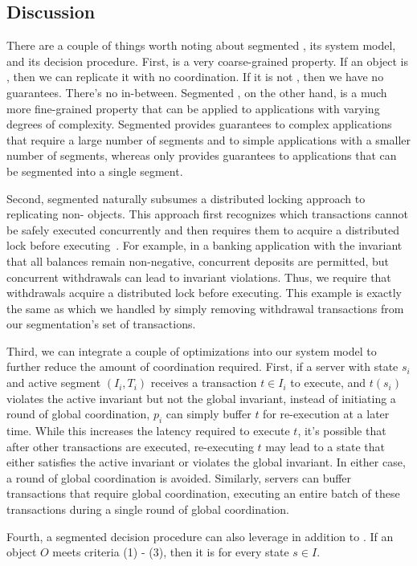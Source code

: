 \subsection{Discussion}
There are a couple of things worth noting about segmented
\invariantconfluence{}, its system model, and its decision procedure. First,
\invariantconfluence{} is a very coarse-grained property. If an object is
\invariantconfluent{}, then we can replicate it with no coordination. If it is
not \invariantconfluent{}, then we have no guarantees. There's no in-between.
Segmented \invariantconfluence{}, on the other hand, is a much more
fine-grained property that can be applied to applications with varying degrees
of complexity. Segmented \invariantconfluence{} provides guarantees to complex
applications that require a large number of segments and to simple applications
with a smaller number of segments, whereas \invariantconfluence{} only provides
guarantees to applications that can be segmented into a single segment.

Second, segmented \invariantconfluence{} naturally subsumes a distributed
locking approach to replicating non-\invariantconfluent{} objects.  This
approach first recognizes which transactions cannot be safely executed
concurrently and then requires them to acquire a distributed lock before
executing~\cite{balegas2015putting, gotsman2016cause}. For example, in a
banking application with the invariant that all balances remain non-negative,
concurrent deposits are permitted, but concurrent withdrawals can lead to
invariant violations. Thus, we require that withdrawals acquire a distributed
lock before executing. This example is exactly the same as
 which we handled by simply removing
withdrawal transactions from our segmentation's set of transactions.

Third, we can integrate a couple of optimizations into our system model to
further reduce the amount of coordination required. First, if a server with
state $s_i$ and active segment $(I_i, T_i)$ receives a transaction $t \in I_i$
to execute, and $t(s_i)$ violates the active invariant but not the global
invariant, instead of initiating a round of global coordination, $p_i$ can
simply buffer $t$ for re-execution at a later time. While this increases the
latency required to execute $t$, it's possible that after other transactions
are executed, re-executing $t$ may lead to a state that either satisfies the
active invariant or violates the global invariant. In either case, a round of
global coordination is avoided. Similarly, servers can buffer transactions that
require global coordination, executing an entire batch of these transactions
during a single round of global coordination.

Fourth, a segmented \invariantconfluence{} decision procedure can also leverage
 in addition to
. If an object $O$ meets
criteria (1) - (3), then it is  for every state $s \in
I$.
